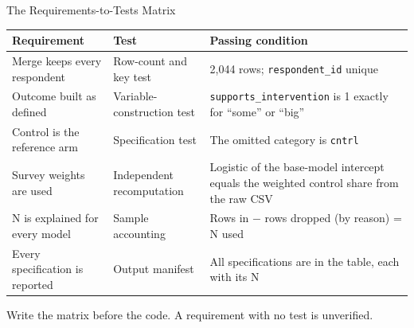 %


\begin{frame}{The Requirements-to-Tests Matrix}
  \footnotesize
  \renewcommand{\arraystretch}{1.2}
  \begin{tabular}{@{}L{0.27\textwidth}L{0.21\textwidth}L{0.42\textwidth}@{}}
    \toprule
    \textbf{Requirement} & \textbf{Test} & \textbf{Passing condition} \\
    \midrule
    Merge keeps every respondent & Row-count and key test & 2,044 rows; \texttt{respondent\_id} unique \\
    Outcome built as defined & Variable-construction test & \texttt{supports\_intervention} is 1 exactly for ``some'' or ``big'' \\
    Control is the reference arm & Specification test & The omitted category is \texttt{cntrl} \\
    Survey weights are used & Independent recomputation & Logistic of the base-model intercept equals the weighted control share from the raw CSV \\
    N is explained for every model & Sample accounting & Rows in $-$ rows dropped (by reason) = N used \\
    Every specification is reported & Output manifest & All specifications are in the table, each with its N \\
    \bottomrule
  \end{tabular}

  \vspace{0.5em}
  \small
  \alert{Write the matrix before the code.} A requirement with no test is unverified.
\end{frame}

